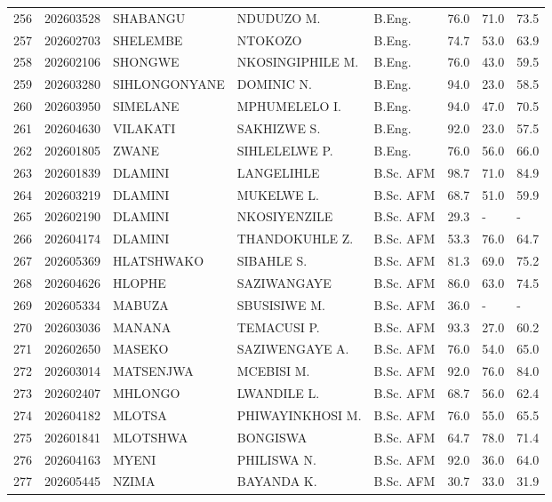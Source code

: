 \documentclass[12pt]{article}
\begin{document}
\begin{longtable}{@{}llllllll@{}}
256 & 202603528 & SHABANGU & NDUDUZO M. & B.Eng. & 76.0 & 71.0 & 73.5 \\
257 & 202602703 & SHELEMBE & NTOKOZO & B.Eng. & 74.7 & 53.0 & 63.9 \\
258 & 202602106 & SHONGWE & NKOSINGIPHILE M. & B.Eng. & 76.0 & 43.0 & 59.5 \\
259 & 202603280 & SIHLONGONYANE & DOMINIC N. & B.Eng. & 94.0 & 23.0 & 58.5 \\
260 & 202603950 & SIMELANE & MPHUMELELO I. & B.Eng. & 94.0 & 47.0 & 70.5 \\
261 & 202604630 & VILAKATI & SAKHIZWE S. & B.Eng. & 92.0 & 23.0 & 57.5 \\
262 & 202601805 & ZWANE & SIHLELELWE P. & B.Eng. & 76.0 & 56.0 & 66.0 \\

263 & 202601839 & DLAMINI & LANGELIHLE & B.Sc. AFM & 98.7 & 71.0 & 84.9 \\
264 & 202603219 & DLAMINI & MUKELWE L. & B.Sc. AFM & 68.7 & 51.0 & 59.9 \\
265 & 202602190 & DLAMINI & NKOSIYENZILE & B.Sc. AFM & 29.3 & - & - \\
266 & 202604174 & DLAMINI & THANDOKUHLE Z. & B.Sc. AFM & 53.3 & 76.0 & 64.7 \\
267 & 202605369 & HLATSHWAKO & SIBAHLE S. & B.Sc. AFM & 81.3 & 69.0 & 75.2 \\
268 & 202604626 & HLOPHE & SAZIWANGAYE & B.Sc. AFM & 86.0 & 63.0 & 74.5 \\
269 & 202605334 & MABUZA & SBUSISIWE M. & B.Sc. AFM & 36.0 & - & - \\
270 & 202603036 & MANANA & TEMACUSI P. & B.Sc. AFM & 93.3 & 27.0 & 60.2 \\
271 & 202602650 & MASEKO & SAZIWENGAYE A. & B.Sc. AFM & 76.0 & 54.0 & 65.0 \\
272 & 202603014 & MATSENJWA & MCEBISI M. & B.Sc. AFM & 92.0 & 76.0 & 84.0 \\
273 & 202602407 & MHLONGO & LWANDILE L. & B.Sc. AFM & 68.7 & 56.0 & 62.4 \\
274 & 202604182 & MLOTSA & PHIWAYINKHOSI M. & B.Sc. AFM & 76.0 & 55.0 & 65.5 \\
275 & 202601841 & MLOTSHWA & BONGISWA & B.Sc. AFM & 64.7 & 78.0 & 71.4 \\
276 & 202604163 & MYENI & PHILISWA N. & B.Sc. AFM & 92.0 & 36.0 & 64.0 \\
277 & 202605445 & NZIMA & BAYANDA K. & B.Sc. AFM & 30.7 & 33.0 & 31.9 \\

\end{longtable}
\end{document}
